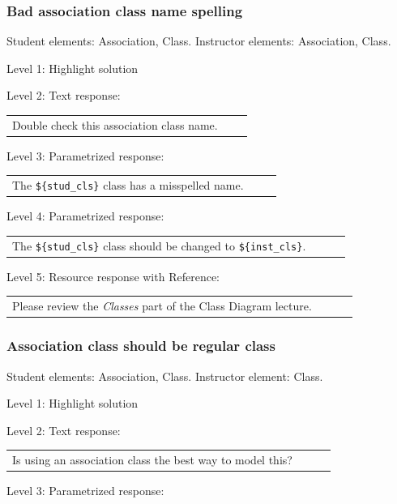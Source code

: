 \subsubsection{Bad association class name spelling}

Student elements: Association, Class. Instructor elements: Association, Class. \medskip

\noindent Level 1: Highlight solution  \medskip

\noindent Level 2: Text response: \medskip

\begin{tabular}{|p{0.9\linewidth}}
Double check this association class name.
\end{tabular} \medskip

\noindent Level 3: Parametrized response: \medskip

\begin{tabular}{|p{0.9\linewidth}}
The \verb|${stud_cls}| class has a misspelled name.
\end{tabular} \medskip

\noindent Level 4: Parametrized response: \medskip

\begin{tabular}{|p{0.9\linewidth}}
The \verb|${stud_cls}| class should be changed to \verb|${inst_cls}|.
\end{tabular} \medskip

\noindent Level 5: Resource response with Reference: \medskip

\begin{tabular}{|p{0.9\linewidth}}
Please review the \textit{Classes} part of the Class Diagram lecture.
\end{tabular} \medskip


\subsubsection{Association class should be regular class}

Student elements: Association, Class. Instructor element: Class. \medskip

\noindent Level 1: Highlight solution  \medskip

\noindent Level 2: Text response: \medskip

\begin{tabular}{|p{0.9\linewidth}}
Is using an association class the best way to model this?
\end{tabular} \medskip

\noindent Level 3: Parametrized response: \medskip


